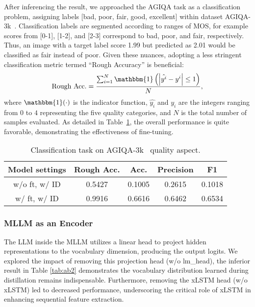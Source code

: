 After inferencing the result, we approached the AGIQA task as a classification problem, assigning labels [bad, poor, fair, good, excellent] within dataset AGIQA-3k~\cite{li2023agiqa}.
Classification labels are segmented according to ranges of MOS, for example scores from [0-1], [1-2], and [2-3] correspond to bad, poor, and fair, respectively.
Thus, an image with a target label score 1.99 but predicted as 2.01 would be classified as fair instead of poor.
Given these nuances, adopting a less stringent classification metric termed ``Rough Accuracy'' is beneficial:
\begin{equation}
    \textrm{Rough Acc.} = \frac{\sum_{i=1}^{N}{\mathbbm{1}\left(\left|\hat{y^i}-y^i\right| \leq 1 \right)}}{N},
\end{equation}
where $\mathbbm{1}(\cdot)$ is the indicator function, $\hat{y_i}$ and $y_i$ are the integers ranging from $0$ to $4$ representing the five quality categories, and $N$ is the total number of samples evaluated. 
As detailed in Table~\ref{tab:ab3cls}, the overall performance is quite favorable, demonstrating the effectiveness of fine-tuning.

\begin{table}[h]
    \centering
    \caption{Classification task on AGIQA-3k~\cite{li2023agiqa} quality aspect.}
    \label{tab:ab3cls}
    \begin{tabular}{c| cccc}
        \toprule
        Model settings & Rough Acc. & Acc. & Precision & F1  \\
        \midrule
        w/o ft, w/ ID & 0.5427 & 0.1005 & 0.2615 & 0.1018 \\
        w/ ft, w/ ID & 0.9916 & 0.6616 & 0.6462 & 0.6534 \\
        \bottomrule
    \end{tabular}
\end{table}

\subsubsection{MLLM as an Encoder}\label{sec:mllm_encoder}
The LLM inside the MLLM utilizes a linear head to project hidden representations to the vocabulary dimension, producing the output logits.
We explored the impact of removing this projection head (w/o lm\_head), the inferior result in Table \ref{tab:ab2} demonstrates the vocabulary distribution learned during distillation remains indispensable.
Furthermore, removing the xLSTM head (w/o xLSTM) led to decreased performance, underscoring the critical role of xLSTM in enhancing sequential feature extraction.

